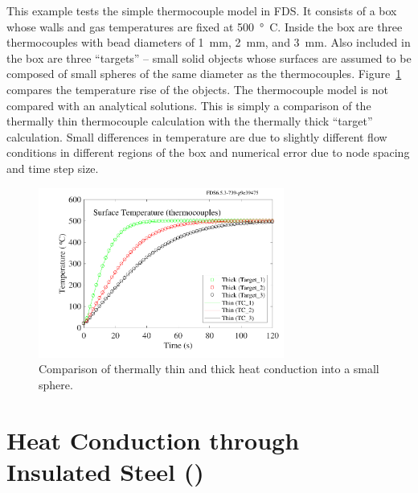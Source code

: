\documentclass[11pt]{book}
\begin{document}
This example tests the simple thermocouple model in FDS. It consists of a box whose walls and gas temperatures are fixed at 500~\si{\degree C}. Inside the box are three thermocouples with bead diameters of 1~mm, 2~mm, and 3~mm. Also included in the box are three ``targets'' -- small solid objects whose surfaces are assumed to be composed of small spheres of the same diameter as the thermocouples. Figure~\ref{thermocouples_fig} compares the temperature rise of the objects. The thermocouple model is not compared with an analytical solutions. This is simply a comparison of the thermally thin thermocouple calculation with the thermally thick ``target'' calculation. Small differences in temperature are due to slightly different flow conditions in different regions of the box and numerical error due to node spacing and time step size.

\begin{figure}[ht]
\centering
\includegraphics[height=2.2in]{SCRIPT_FIGURES/thermocouples}
\caption[The  test case]{Comparison of thermally thin and thick heat conduction into a small sphere.}
\label{thermocouples_fig}
\end{figure}



\section{Heat Conduction through Insulated Steel (\texorpdfstring{}{insulated\_steel\_x})}
\label{insulated_steel_pipe}
\label{insulated_steel_plate}
\end{document}
